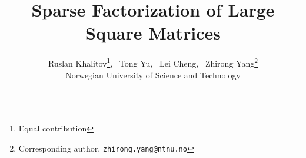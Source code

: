 \documentclass{article}
\title{Sparse Factorization of Large Square Matrices}
\date{}
\author{ Ruslan Khalitov\thanks{Equal contribution}, \  Tong Yu\samethanks, \  Lei Cheng, \ Zhirong Yang\thanks{Corresponding author, \texttt{zhirong.yang@ntnu.no}}\\
Norwegian University of Science and Technology}
\begin{document}
	\maketitle

\newcommand{\matA}{\mathbf{A}}
\newcommand{\matB}{\mathbf{B}}
\newcommand{\matC}{\mathbf{C}}
\newcommand{\matD}{\mathbf{D}}
\newcommand{\matE}{\mathbf{E}}
\newcommand{\matF}{\mathbf{F}}
\newcommand{\matG}{\mathbf{G}}
\newcommand{\matH}{\mathbf{H}}
\newcommand{\matI}{\mathbf{I}}
\newcommand{\matK}{\mathbf{K}}
\newcommand{\matL}{\mathbf{L}}
\newcommand{\matM}{\mathbf{M}}
\newcommand{\matN}{\mathbf{N}}
\newcommand{\matO}{\mathbf{O}}
\newcommand{\matP}{\mathbf{P}}
\newcommand{\matQ}{\mathbf{Q}}
\newcommand{\matR}{\mathbf{R}}
\newcommand{\matS}{\mathbf{S}}
\newcommand{\matT}{\mathbf{T}}
\newcommand{\matU}{\mathbf{U}}
\newcommand{\matV}{\mathbf{V}}
\newcommand{\matW}{\mathbf{W}}
\newcommand{\matX}{\mathbf{X}}
\newcommand{\matY}{\mathbf{Y}}
\newcommand{\matZ}{\mathbf{Z}}
\newcommand{\matg}{\mathbf{g}}

\newcommand{\calA}{\mathcal{A}}
\newcommand{\calB}{\mathcal{B}}
\newcommand{\calC}{\mathcal{C}}
\newcommand{\calD}{\mathcal{D}}
\newcommand{\calE}{\mathcal{E}}
\newcommand{\calF}{\mathcal{F}}
\newcommand{\calG}{\mathcal{G}}
\newcommand{\calH}{\mathcal{H}}
\newcommand{\calI}{\mathcal{I}}
\newcommand{\calJ}{\mathcal{J}}
\newcommand{\calK}{\mathcal{K}}
\newcommand{\calL}{\mathcal{L}}
\newcommand{\calM}{\mathcal{M}}
\newcommand{\calN}{\mathcal{N}}
\newcommand{\calO}{\mathcal{O}}
\newcommand{\calP}{\mathcal{P}}
\newcommand{\calQ}{\mathcal{Q}}
\newcommand{\calR}{\mathcal{R}}
\newcommand{\calS}{\mathcal{S}}
\newcommand{\calT}{\mathcal{T}}
\newcommand{\calU}{\mathcal{U}}
\newcommand{\calV}{\mathcal{V}}
\newcommand{\calW}{\mathcal{W}}
\newcommand{\calX}{\mathcal{X}}
\newcommand{\calY}{\mathcal{Y}}
\newcommand{\calZ}{\mathcal{Z}}



\newcommand{\bbA}{\mathbb{A}}
\newcommand{\bbB}{\mathbb{B}}
\newcommand{\bbR}{\mathbb{R}}
\newcommand{\bbZ}{\mathbb{Z}}
\newcommand{\bbE}{\mathbb{E}}
\newcommand{\bbH}{\mathbb{H}}

\newcommand{\veca}{\mathbf{a}}
\newcommand{\vecb}{\mathbf{b}}
\newcommand{\vecc}{\mathbf{c}}
\newcommand{\vecd}{\mathbf{d}}
\newcommand{\vece}{\mathbf{e}}
\newcommand{\vecf}{\mathbf{f}}
\newcommand{\vecg}{\mathbf{g}}
\newcommand{\vech}{\mathbf{h}}
\newcommand{\veci}{\mathbf{i}}
\newcommand{\vecj}{\mathbf{j}}
\newcommand{\veck}{\mathbf{k}}
\newcommand{\vecl}{\mathbf{l}}
\newcommand{\vecm}{\mathbf{m}}
\newcommand{\vecn}{\mathbf{n}}
\newcommand{\veco}{\mathbf{o}}
\newcommand{\vecp}{\mathbf{p}}
\newcommand{\vecq}{\mathbf{q}}
\newcommand{\vecr}{\mathbf{r}}
\newcommand{\vecs}{\mathbf{s}}
\newcommand{\vect}{\mathbf{t}}
\newcommand{\vecu}{\mathbf{u}}
\newcommand{\vecv}{\mathbf{v}}
\newcommand{\vecw}{\mathbf{w}}
\newcommand{\vecx}{\mathbf{x}}
\newcommand{\vecy}{\mathbf{y}}
\newcommand{\vecz}{\mathbf{z}}
\end{document}
